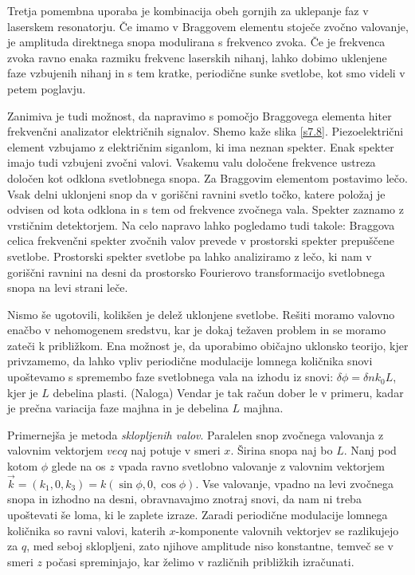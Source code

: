 Tretja pomembna uporaba je kombinacija obeh gornjih za uklepanje faz
v laserskem resonatorju. Če imamo v Braggovem elementu stoječe zvočno
valovanje, je amplituda direktnega snopa modulirana s frekvenco zvoka.
Če je frekvenca zvoka ravno enaka razmiku frekvenc laserskih nihanj,
lahko dobimo uklenjene faze vzbujenih nihanj in s tem kratke, periodične
sunke svetlobe, kot smo videli v petem poglavju.

Zanimiva je tudi možnost, da napravimo s pomočjo Braggovega elementa
hiter frekvenčni analizator električnih signalov. Shemo kaže slika
\ref{s7.8}. Piezoelektrični element vzbujamo z električnim siganlom,
ki ima neznan spekter. Enak spekter imajo tudi vzbujeni zvočni valovi.
Vsakemu valu določene frekvence ustreza določen kot odklona svetlobnega
snopa. Za Braggovim elementom postavimo lečo. Vsak delni uklonjeni
snop da v goriščni ravnini svetlo točko, katere položaj je odvisen
od kota odklona in s tem od frekvence zvočnega vala. Spekter zaznamo
z vrstičnim detektorjem. Na celo napravo lahko pogledamo tudi takole:
Braggova celica frekvenčni spekter zvočnih valov prevede v prostorski
spekter prepuščene svetlobe. Prostorski spekter svetlobe pa lahko
analiziramo z lečo, ki nam v goriščni ravnini na desni da prostorsko
Fourierovo transformacijo svetlobnega snopa na levi strani leče.

Nismo še ugotovili, kolikšen je delež uklonjene svetlobe. Rešiti moramo
valovno enačbo v nehomogenem sredstvu, kar je dokaj težaven problem
in se moramo zateči k približkom. Ena možnost je, da uporabimo običajno
uklonsko teorijo, kjer privzamemo, da lahko vpliv periodične modulacije
lomnega količnika snovi upoštevamo s spremembo faze svetlobnega vala
na izhodu iz snovi: $\delta\phi=\delta nk_{0}L$, kjer je $L$ debelina
plasti. (Naloga) Vendar je tak račun dober le v primeru, kadar je
prečna variacija faze majhna in je debelina $L$ majhna.

Primernejša je metoda \textit{sklopljenih valov}. Paralelen snop zvočnega
valovanja z valovnim vektorjem $vec{q}$ naj potuje v smeri $x$.
Širina snopa naj bo $L$. Nanj pod kotom $\phi$ glede na os $z$
vpada ravno svetlobno valovanje z valovnim vektorjem $\vec{k}=(k_{1},0,k_{3})=k(\sin\phi,0,\cos\phi)$.
Vse valovanje, vpadno na levi zvočnega snopa in izhodno na desni,
obravnavajmo znotraj snovi, da nam ni treba upoštevati še loma, ki
le zaplete izraze. Zaradi periodične modulacije lomnega količnika
so ravni valovi, katerih $x$-komponente valovnih vektorjev se razlikujejo
za $q$, med seboj sklopljeni, zato njihove amplitude niso konstantne,
temveč se v smeri $z$ počasi spreminjajo, kar želimo v različnih
približkih izračunati.

